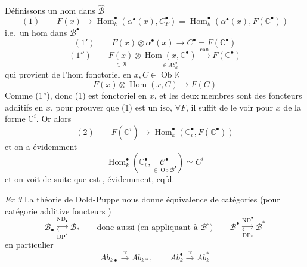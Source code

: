\documentclass[11pt,a4paper]{article}
\begin{document}
Définissons un hom dans $\widehat{\mathcal{B}}$
\[
(1) \qquad F(x) \longrightarrow \operatorname{Hom}^{\bullet}_k(\alpha^{\bullet}(x), C^{\bullet}_F)
= \operatorname{Hom}^{\bullet}_k(\alpha^{\bullet}(x), F(\mathbb{C}^{\bullet}))
\]
i.e.\ un hom dans $\mathcal{B}^{\bullet}$
\[
(1') \qquad F(x) \otimes \alpha^{\bullet}(x) \longrightarrow C^{\bullet} = F(\mathbb{C}^{\bullet})
\]
\[
(1'') \qquad \underset{\in \mathcal{B}}{F(x)} \otimes \underset{\in \mathit{Ab}_k^{\bullet}}{\operatorname{Hom}(x, \mathbb{C}^{\bullet})} \xrightarrow{\ \mathrm{can}\ } F(\mathbb{C}^{\bullet})
\]
qui provient de l'hom fonctoriel en $x, C \in \operatorname{Ob} \mathbb{K}$
\[
F(x) \otimes \operatorname{Hom}(x, C) \longrightarrow F(C)
\]
Comme (1''), donc (1) est fonctoriel en $x$, et les deux membres sont des foncteurs
additifs en $x$, pour prouver que \struck{\ill{}} (1) est un iso, $\forall F$, il suffit
de le voir pour $x$ de la forme $\mathbb{C}^i$. Or alors
\[
(2) \qquad F(\mathbb{C}^i) \longrightarrow \operatorname{Hom}^{\bullet}_k(\mathbb{C}^{\bullet}_i, F(\mathbb{C}^{\bullet}))
\]
et on a évidemment
\[
\operatorname{Hom}^{\bullet}_k(\mathbb{C}^{\bullet}_i, \underset{\in \operatorname{Ob} \mathcal{B}^{\bullet}}{\mathcal{C}^{\bullet}}) \simeq C^i
\]
et on voit de suite que \ill{} \ill{} est \ill{}, \ill{} évidemment, cqfd.

\emph{Ex 3} La théorie de Dold-Puppe nous donne 
équivalence de catégories (pour  catégorie additive \ill{} \ill{}
foncteurs )
\[
\mathcal{B}_{\bullet} \underset{\mathrm{DP}^{*}}{\overset{\mathrm{ND}_{\bullet}}{\rightleftarrows}} \mathcal{B}_{*}
\qquad \text{donc aussi (en appliquant à } \mathcal{B}^{\circ}\text{)} \qquad
\mathcal{B}^{\bullet} \underset{\mathrm{DP}_{*}}{\overset{\mathrm{ND}^{\bullet}}{\rightleftarrows}} \mathcal{B}^{*}
\]
en particulier
\[
\mathit{Ab}_{k\bullet} \xrightarrow{\ \approx\ } \mathit{Ab}_{k*}, \qquad \mathit{Ab}_k^{\bullet} \xrightarrow{\ \approx\ } \mathit{Ab}_k^{*}
\]
\end{document}
